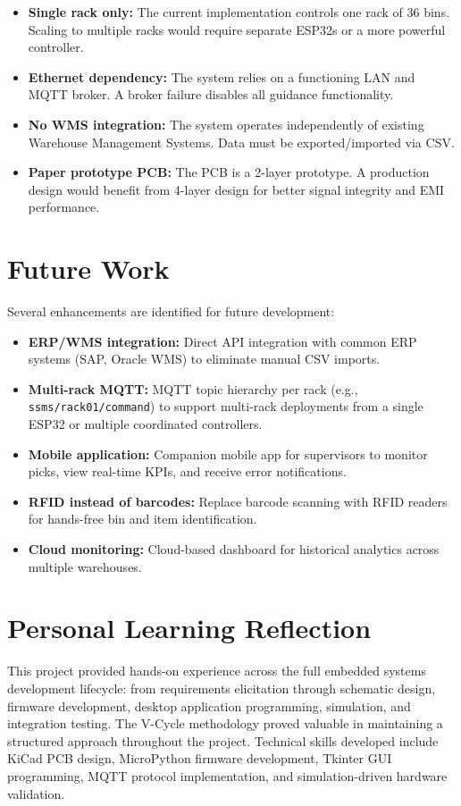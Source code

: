 \begin{itemize}
  \item \textbf{Single rack only:} The current implementation controls one rack of 36 bins. Scaling to multiple racks would require separate ESP32s or a more powerful controller.
  \item \textbf{Ethernet dependency:} The system relies on a functioning LAN and MQTT broker. A broker failure disables all guidance functionality.
  \item \textbf{No WMS integration:} The system operates independently of existing Warehouse Management Systems. Data must be exported/imported via CSV.
  \item \textbf{Paper prototype PCB:} The PCB is a 2-layer prototype. A production design would benefit from 4-layer design for better signal integrity and EMI performance.
\end{itemize}

\section{Future Work}
\label{sec:future-work}

Several enhancements are identified for future development:

\begin{itemize}
  \item \textbf{ERP/WMS integration:} Direct API integration with common ERP systems (SAP, Oracle WMS) to eliminate manual CSV imports.
  \item \textbf{Multi-rack MQTT:} MQTT topic hierarchy per rack (e.g., \texttt{ssms/rack01/command}) to support multi-rack deployments from a single ESP32 or multiple coordinated controllers.
  \item \textbf{Mobile application:} Companion mobile app for supervisors to monitor picks, view real-time KPIs, and receive error notifications.
  \item \textbf{RFID instead of barcodes:} Replace barcode scanning with RFID readers for hands-free bin and item identification.
  \item \textbf{Cloud monitoring:} Cloud-based dashboard for historical analytics across multiple warehouses.
\end{itemize}

\section{Personal Learning Reflection}
\label{sec:reflection}

This project provided hands-on experience across the full embedded systems development lifecycle: from requirements elicitation through schematic design, firmware development, desktop application programming, simulation, and integration testing. The V-Cycle methodology proved valuable in maintaining a structured approach throughout the project. Technical skills developed include KiCad\cite{kicad_docs} PCB design, MicroPython\cite{micropython_docs} firmware development, Tkinter GUI programming, MQTT\cite{oasis_mqtt} protocol implementation, and simulation-driven hardware validation.

